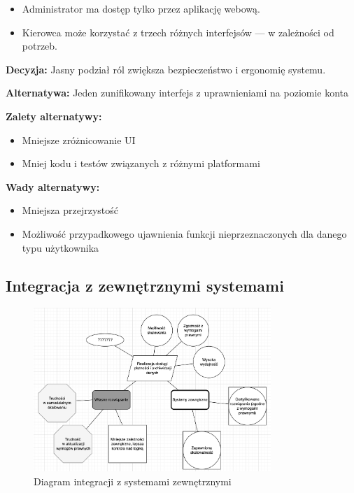 \documentclass[12pt]{article}
\begin{document}
\begin{itemize}
\item Administrator ma dostęp tylko przez aplikację webową.
\item Kierowca może korzystać z trzech różnych interfejsów — w zależności od potrzeb.
\end{itemize}

\textbf{Decyzja:} Jasny podział ról zwiększa bezpieczeństwo i ergonomię systemu.

\textbf{Alternatywa:} Jeden zunifikowany interfejs z uprawnieniami na poziomie konta

\textbf{Zalety alternatywy:}
\begin{itemize}
\item Mniejsze zróżnicowanie UI
\item Mniej kodu i testów związanych z różnymi platformami
\end{itemize}

\textbf{Wady alternatywy:}
\begin{itemize}
\item Mniejsza przejrzystość
\item Możliwość przypadkowego ujawnienia funkcji nieprzeznaczonych dla danego typu użytkownika
\end{itemize}

\subsection{Integracja z zewnętrznymi systemami}
\begin{figure}[H]
\centering
\includegraphics[width=0.8\textwidth]{realizacja_obslugi_platnosci_i_archiwizacji_danych.png}
\caption{Diagram integracji z systemami zewnętrznymi}
\label{fig:integration}
\end{figure}
\end{document}
